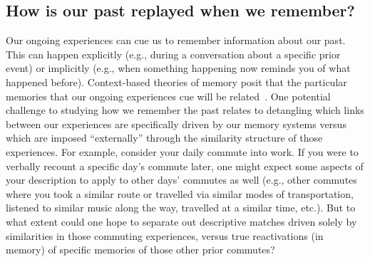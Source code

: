 \documentclass{article}
\begin{document}
\subsection*{How is our past replayed when we remember?}
Our ongoing experiences can cue us to remember information about our past.  This can happen explicitly (e.g., during a conversation about a specific prior event) or implicitly (e.g., when something happening now reminds you of what happened before).  Context-based theories of memory posit that the particular memories that our ongoing experiences cue will be related~\citep[contextually, semantically, functionally, etc.; e.g., ][]{PolyEtal09}.  One potential challenge to studying how we remember the past relates to detangling which links between our experiences are specifically driven by our memory systems versus which are imposed ``externally'' through the similarity structure of those experiences.  For example, consider your daily commute into work.  If you were to verbally recount a specific day's commute later, one might expect some aspects of your description to apply to other days' commutes as well (e.g., other commutes where you took a similar route or travelled via similar modes of transportation, listened to similar music along the way, travelled at a similar time, etc.).  But to what extent could one hope to separate out descriptive matches driven solely by similarities in those commuting experiences, versus true reactivations (in memory) of specific memories of those other prior commutes?
\end{document}
